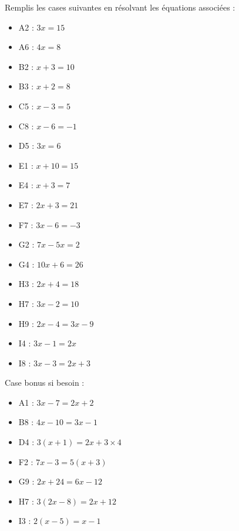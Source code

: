 \begin{minipage}{0.40\textwidth}
Remplis les cases suivantes en résolvant les équations associées :
    \begin{multicols}{2}
        \begin{itemize}[leftmargin=1em]
            \item A2 : $3x=15$
            \item A6 : $4x=8$
            \item B2 : $x+3=10$
            \item B3 : $x+2=8$
            \item C5 : $x-3=5$
            \item C8 : $x-6=-1$
            \item D5 : $3x=6$
            \item E1 : $x+10=15$
            \item E4 : $x+3=7$
            \item E7 : $2x+3=21$
            \item F7 : $3x-6=-3$
            \item G2 : $7x-5x=2$
            \item G4 : $10x+6=26$
            \item H3 : $2x+4=18$
            \item H7 : $3x-2=10$
            \item H9 : $2x-4=3x-9$
            \item I4 : $3x-1=2x$
            \item I8 : $3x-3=2x+3$
        \end{itemize}
    \end{multicols}

Case bonus si besoin :
        \begin{itemize}[leftmargin=1em]
            \item A1 : $3x-7=2x+2$
            \item B8 : $4x-10=3x-1$
            \item D4 : $3(x+1)=2x+3\times4$
            \item F2 : $7x-3=5(x+3)$
            \item G9 : $2x+24=6x-12$
            \item H7 : $3(2x-8)=2x+12$
            \item I3 : $2(x-5)=x-1$
        \end{itemize}
\end{minipage}